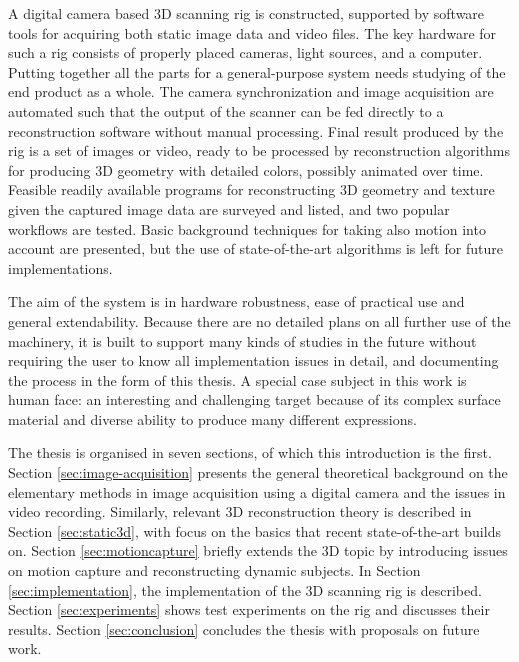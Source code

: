 
A digital camera based 3D scanning rig is constructed, supported by software tools for acquiring both static image data and video files.
The key hardware for such a rig consists of properly placed cameras, light sources, and a computer.
Putting together all the parts for a general-purpose system needs studying of the end product as a whole.
The camera synchronization and image acquisition are automated such that the output of the scanner can be fed directly to a reconstruction software without manual processing.
Final result produced by the rig is a set of images or video, ready to be processed by reconstruction algorithms for producing 3D geometry with detailed colors, possibly animated over time.
Feasible readily available programs for reconstructing 3D geometry and texture given the captured image data are surveyed and listed, and two popular workflows are tested.
Basic background techniques for taking also motion into account are presented, but the use of state-of-the-art algorithms is left for future implementations.


The aim of the system is in hardware robustness, ease of practical use and general extendability.
Because there are no detailed plans on all further use of the machinery, it is built to support many kinds of studies in the future without requiring the user to know all implementation issues in detail, and documenting the process in the form of this thesis.
A special case subject in this work is human face: an interesting and challenging target because of its complex surface material and diverse ability to produce many different expressions.


The thesis is organised in seven sections, of which this introduction is the first.
Section \ref{sec:image-acquisition} presents the general theoretical background on the elementary methods in image acquisition using a digital camera and the issues in video recording.
Similarly, relevant 3D reconstruction theory is described in Section \ref{sec:static3d}, with focus on the basics that recent state-of-the-art builds on.
Section \ref{sec:motioncapture} briefly extends the 3D topic by introducing issues on motion capture and reconstructing dynamic subjects.
In Section \ref{sec:implementation}, the implementation of the 3D scanning rig is described.
Section \ref{sec:experiments} shows test experiments on the rig and discusses their results.
Section \ref{sec:conclusion} concludes the thesis with proposals on future work.
